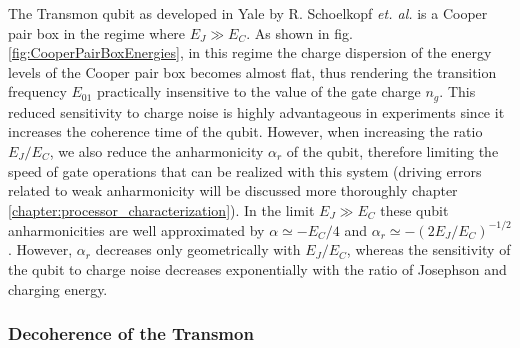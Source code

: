 The Transmon qubit as developed in Yale by R. Schoelkopf {\it et. al.} \cite{koch_charge-insensitive_2007,wallraff_strong_2004} is a Cooper pair box in the regime where $E_J \gg E_C$. As shown in fig. \ref{fig:CooperPairBoxEnergies}, in this regime the charge dispersion of the energy levels of the Cooper pair box becomes almost flat, thus rendering the transition frequency $E_{01}$ practically insensitive to the value of the gate charge $n_g$. This reduced sensitivity to charge noise is highly advantageous in experiments since it increases the coherence time of the qubit. However, when increasing the ratio $E_J/E_C$, we also reduce the anharmonicity $\alpha_r$ of the qubit, therefore limiting the speed of gate operations that can be realized with this system (driving errors related to weak anharmonicity will be discussed more thoroughly chapter \ref{chapter:processor_characterization}). In the limit $E_J \gg E_C$ these qubit anharmonicities are well approximated by $\alpha \simeq -E_C/4$ and $\alpha_r \simeq -(2 E_J / E_C)^{-1/2}$. However, $\alpha_r$ decreases only geometrically with $E_J/E_C$, whereas the sensitivity of the qubit to charge noise decreases exponentially with the ratio of Josephson and charging energy.

\subsubsection{Decoherence of the Transmon}

